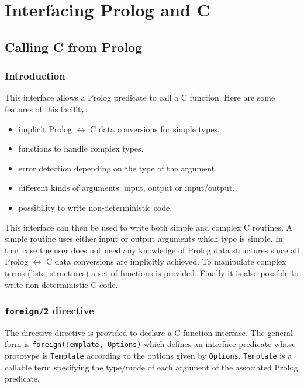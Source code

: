 \newpage
\section{Interfacing Prolog and C}
\label{Interfacing-Prolog-and-C}
\subsection{Calling C from Prolog}
\label{Calling-C-from-Prolog}

\subsubsection{Introduction}
This interface allows a Prolog predicate to call a C function. Here are some
features of this facility:

\begin{itemize}

\item implicit Prolog $\leftrightarrow$ C data conversions for simple types.

\item functions to handle complex types.

\item error detection depending on the type of the argument.

\item different kinds of arguments: input, output or input/output.

\item possibility to write non-deterministic code.

\end{itemize}

This interface can then be used to write both simple and complex C routines.
A simple routine uses either input or output arguments which type is simple.
In that case the user does not need any knowledge of Prolog data structures
since all Prolog $\leftrightarrow$ C data conversions are implicitly
achieved. To manipulate complex terms (lists, structures) a set of
functions is provided. Finally it is also possible to write
non-deterministic C code.

\subsubsection{\texttt{foreign/2} directive}
\label{foreign/2-directive}
The  directive  directive is provided
to declare a C function interface. The general form is
\texttt{foreign(Template, Options)} which defines an interface predicate
whose prototype is \texttt{Template} according to the options given by
\texttt{Options}. \texttt{Template} is a callable term specifying the
type/mode of each argument of the associated Prolog predicate.

